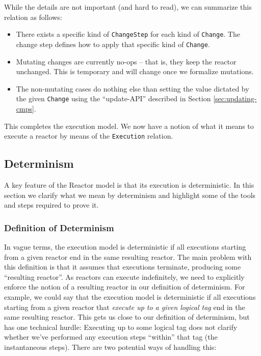 While the details are not important (and hard to read), we can summarize this relation as follows:

\begin{itemize}
  \item There exists a specific kind of \lstinline{ChangeStep} for each kind of \lstinline{Change}.
        The change step defines how to apply that specific kind of \lstinline{Change}.
  \item Mutating changes are currently no-ops -- that is, they keep the reactor unchanged.
        This is temporary and will change once we formalize mutations.
  \item The non-mutating cases do nothing else than setting the value dictated by the given \lstinline{Change} using the ``update-API'' described in Section \ref{sec:updating-cmps}.
\end{itemize}

This completes the execution model.
We now have a notion of what it means to execute a reactor by means of the \lstinline{Execution} relation.

\subsection{Determinism}

A key feature of the Reactor model is that its execution is deterministic.
In this section we clarify what we mean by determinism and highlight some of the tools and steps required to prove it.

\subsubsection{Definition of Determinism}

In vague terms, the execution model is deterministic if all executions starting from a given reactor end in the same resulting reactor.
The main problem with this definition is that it assumes that executions terminate, producing some ``resulting reactor''.
As reactors can execute indefinitely, we need to explicitly enforce the notion of a resulting reactor in our definition of determinism.
For example, we could say that the execution model is deterministic if all executions starting from a given reactor that \emph{execute up to a given logical tag} end in the same resulting reactor.
This gets us close to our definition of determinism, but has one technical hurdle: 
Executing up to some logical tag does not clarify whether we've performed any execution steps ``within'' that tag (the instantaneous steps).
There are two potential ways of handling this:

